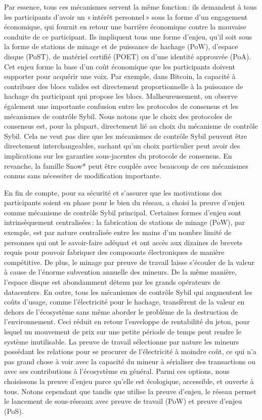 \documentclass[runningheads,francais,a4paper]{llncs}
\begin{document}
Par essence, tous ces mécanismes servent la même fonction\,: ils demandent à tous les participants d'avoir un «\,intérêt
personnel\,»  sous la forme d'un engagement économique, qui fournit en retour une barrière économique contre la mauvaise
conduite de ce participant. Ils impliquent tous une forme d'enjeu, qu'il soit sous la forme de stations de minage et de
puissance de hachage (PoW), d'espace disque (PoST), de matériel certifié (POET) ou d'une identité approuvée (PoA). Cet
enjeu forme la base d'un coût économique que les participants doivent supporter pour acquérir une voix. Par exemple,
dans Bitcoin, la capacité à contribuer des blocs valides est directement proportionnelle à la puissance de hachage du
participant qui propose les blocs. Malheureusement, on observe également une importante confusion entre les protocoles de
consensus et les mécanismes de contrôle Sybil. Nous notons que le choix des protocoles de consensus est, pour la
plupart, directement lié au choix du mécanisme de contrôle Sybil. Cela ne veut pas dire que les mécanismes de contrôle
Sybil peuvent être directement interchangeables, sachant qu'un choix particulier peut avoir des implications sur les
garanties sous-jacentes du protocole de consensus. En revanche, la famille Snow* peut être couplée avec beaucoup de ces
mécanismes connus sans nécessiter de modification importante.

En fin de compte, pour sa sécurité et s'assurer que les motivations des participants soient en phase pour le bien du
réseau, \AVATokenName{} a choisi la preuve d'enjeu comme mécanisme de contrôle Sybil principal. Certaines formes
d'enjeu sont intrinsèquement centralisées\,: la fabrication de stations de minage (PoW), par exemple, est par nature
centralisée entre les mains d'un nombre limité de personnes qui ont le savoir-faire adéquat et ont accès aux dizaines
de brevets requis pour pouvoir fabriquer des composants électroniques de manière compétitive. De plus, le minage par
preuve de travail laisse s'écouler de la valeur à cause de l'énorme subvention annuelle des mineurs. De la même manière,
l'espace disque est abondamment détenu par les grands opérateurs de datacenters. En outre, tous les mécanismes de
contrôle Sybil qui augmentent les coûts d'usage, comme l'électricité pour le hachage, transfèrent de la valeur en dehors
de l'écosystème sans même aborder le problème de la destruction de l'environnement. Ceci réduit en retour l'enveloppe de
rentabilité du jeton, pour lequel un mouvement de prix sur une petite période de temps peut rendre le système
inutilisable. La preuve de travail sélectionne par nature les mineurs possédant les relations pour se procurer de
l'électricité à moindre coût, ce qui n'a pas grand chose à voir avec la capacité du mineur à sérialiser des
transactions ou avec ses contributions à l'écosystème en général. Parmi ces options, nous choisissons la preuve d'enjeu
parce qu'elle est écologique, accessible, et ouverte à tous. Notons cependant que tandis que \AVATokenName{} utilise la
preuve d'enjeu, le réseau \AVAPlatformName{} permet le lancement de sous-réseaux avec preuve de travail (PoW) et preuve
d'enjeu (PoS).
\end{document}
